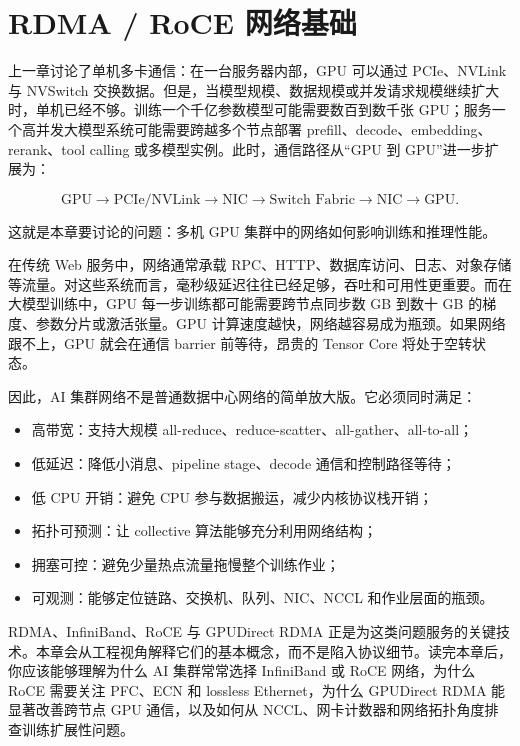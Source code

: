 \chapter{RDMA / RoCE 网络基础}
\label{chap:rdma-roce}

上一章讨论了单机多卡通信：在一台服务器内部，GPU 可以通过 PCIe、NVLink 与 NVSwitch 交换数据。但是，当模型规模、数据规模或并发请求规模继续扩大时，单机已经不够。训练一个千亿参数模型可能需要数百到数千张 GPU；服务一个高并发大模型系统可能需要跨越多个节点部署 prefill、decode、embedding、rerank、tool calling 或多模型实例。此时，通信路径从“GPU 到 GPU”进一步扩展为：

\[
  \text{GPU} \rightarrow \text{PCIe/NVLink} \rightarrow \text{NIC} \rightarrow \text{Switch Fabric} \rightarrow \text{NIC} \rightarrow \text{GPU}.
\]

这就是本章要讨论的问题：多机 GPU 集群中的网络如何影响训练和推理性能。

在传统 Web 服务中，网络通常承载 RPC、HTTP、数据库访问、日志、对象存储等流量。对这些系统而言，毫秒级延迟往往已经足够，吞吐和可用性更重要。而在大模型训练中，GPU 每一步训练都可能需要跨节点同步数 GB 到数十 GB 的梯度、参数分片或激活张量。GPU 计算速度越快，网络越容易成为瓶颈。如果网络跟不上，GPU 就会在通信 barrier 前等待，昂贵的 Tensor Core 将处于空转状态。

因此，AI 集群网络不是普通数据中心网络的简单放大版。它必须同时满足：

\begin{itemize}
  \item 高带宽：支持大规模 all-reduce、reduce-scatter、all-gather、all-to-all；
  \item 低延迟：降低小消息、pipeline stage、decode 通信和控制路径等待；
  \item 低 CPU 开销：避免 CPU 参与数据搬运，减少内核协议栈开销；
  \item 拓扑可预测：让 collective 算法能够充分利用网络结构；
  \item 拥塞可控：避免少量热点流量拖慢整个训练作业；
  \item 可观测：能够定位链路、交换机、队列、NIC、NCCL 和作业层面的瓶颈。
\end{itemize}

RDMA、InfiniBand、RoCE 与 GPUDirect RDMA 正是为这类问题服务的关键技术。本章会从工程视角解释它们的基本概念，而不是陷入协议细节。读完本章后，你应该能够理解为什么 AI 集群常常选择 InfiniBand 或 RoCE 网络，为什么 RoCE 需要关注 PFC、ECN 和 lossless Ethernet，为什么 GPUDirect RDMA 能显著改善跨节点 GPU 通信，以及如何从 NCCL、网卡计数器和网络拓扑角度排查训练扩展性问题。

